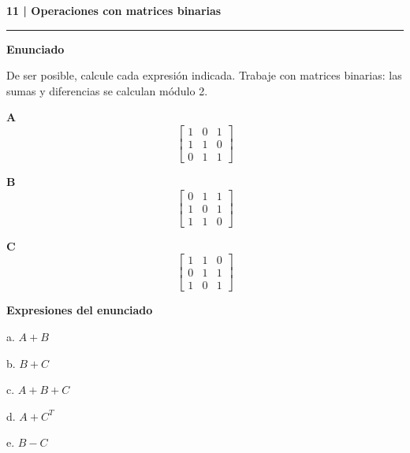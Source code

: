 \documentclass[11pt,a4paper,landscape]{article}
\newcommand{\titulo}[1]{{\LARGE\bfseries #1}\par\smallskip\hrule\medskip}
\begin{document}
\newpage{}\hypertarget{1.2-11}{}
\titulo{11 | Operaciones con matrices binarias}
\textbf{Enunciado}\par De ser posible, calcule cada expresión indicada. Trabaje con matrices binarias: las sumas y diferencias se calculan módulo 2.
\par\smallskip \begin{minipage}[t]{.47\linewidth}\centering \textbf{A}\[\begin{bmatrix}1 & 0 & 1\\1 & 1 & 0\\0 & 1 & 1\end{bmatrix}\]\end{minipage}\hfill\begin{minipage}[t]{.47\linewidth}\centering \textbf{B}\[\begin{bmatrix}0 & 1 & 1\\1 & 0 & 1\\1 & 1 & 0\end{bmatrix}\]\end{minipage}\par\smallskip
\par\smallskip \begin{minipage}[t]{.47\linewidth}\centering \textbf{C}\[\begin{bmatrix}1 & 1 & 0\\0 & 1 & 1\\1 & 0 & 1\end{bmatrix}\]\end{minipage}\par\smallskip
\textbf{Expresiones del enunciado}\par
a. \(A+B\)\par
b. \(B+C\)\par
c. \(A+B+C\)\par
d. \(A+C^T\)\par
e. \(B-C\)\par
\end{document}
